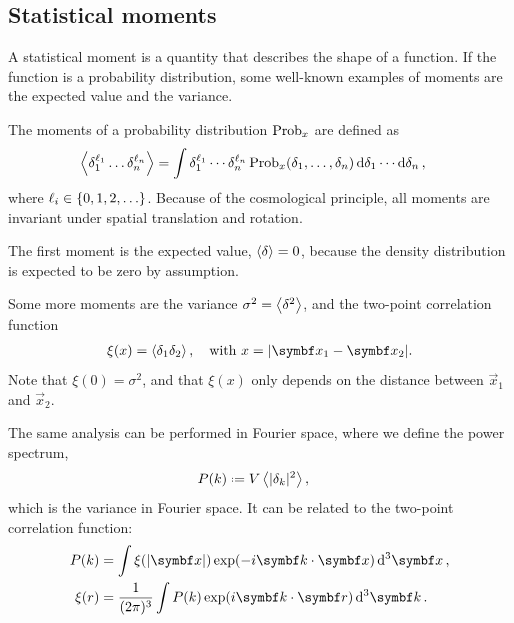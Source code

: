 \subsection{Statistical moments}
A statistical moment is a quantity that describes the shape of a function. If the function is a probability distribution, some well-known examples of moments are the expected value and the variance.

The moments of a probability distribution $\operatorname{Prob}_x$ are defined as
\begin{align*}
	\left\langle \delta_1^{\ell_1} \dots \delta_n^{\ell_n} \right\rangle
	&= \int \delta_1^{\ell_1} \cdots \delta_n^{\ell_n}
	\operatorname{Prob}_x(\delta_1, \dots, \delta_n) \dd{\delta_1} \cdots \dd{\delta_n},
\end{align*}
where $\ell_i \in \left\{ {0, 1, 2, \dots} \right\}$. Because of the cosmological principle, all moments are invariant under spatial translation and rotation.

The first moment is the expected value, $\left\langle \delta \right\rangle = 0$, because the density distribution is expected to be zero by assumption.

Some more moments are the variance $\sigma^2 = \left\langle \delta^2 \right\rangle$, and the two-point correlation function
\begin{align*}
	\xi(x) = \moment{\delta_1 \delta_2}, \quad \text{with } x = \abs{\vec{x}_1 - \vec{x}_2}.
\end{align*}
Note that $\xi(0) = \sigma^2$, and that $\xi(x)$ only depends on the distance between $\vec{x}_1$ and $\vec{x}_2$.

The same analysis can be performed in Fourier space,
where we define the power spectrum,
\begin{align*}
	P(k)
	&\defeq V \moment{\abs{\delta_k}^2},
\end{align*}
which is the variance in Fourier space. It can be related to the two-point correlation function:
\begin{align*}
	P(k)
	&= \int \xi(\abs{\vec{x}}) \exp(-i\vec{k}\cdot\vec{x}) \dd{^3 \vec{x}},\\
	\xi(r)
	&= \frac{1}{(2\pi)^3} \int P(k) \exp(i \vec{k}\cdot\vec{r}) \dd{^3\vec{k}}.
\end{align*}
	
